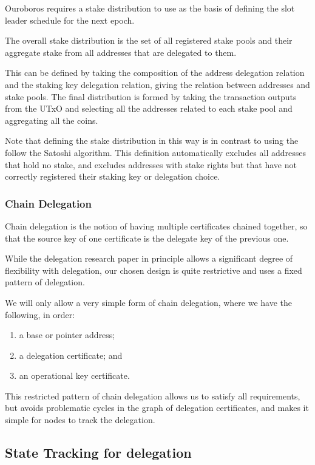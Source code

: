 \documentclass[11pt,a4paper,dvipsnames,twosided]{article}
\begin{document}
Ouroboros \citep{ouroboros_classic} requires a stake distribution to
use as the basis of defining the slot leader schedule for the next
epoch.

The overall stake distribution is the set of all registered stake pools
and their aggregate stake from all addresses that are delegated to them.

This can be defined by taking the composition of the address delegation
relation and the staking key delegation relation, giving the relation
between addresses and stake pools. The final distribution is formed by
taking the transaction outputs from the UTxO and selecting all the
addresses related to each stake pool and aggregating all the coins.

Note that defining the stake distribution in this way is in contrast to
using the follow the Satoshi algorithm. This definition automatically
excludes all addresses that hold no stake, and excludes addresses with
stake rights but that have not correctly registered their staking key or
delegation choice.

\subsubsection{Chain Delegation}
\label{chain-delegation}

Chain delegation is the notion of having multiple certificates chained
together, so that the source key of one certificate is the delegate key
of the previous one.

While the delegation research paper in principle allows a significant
degree of flexibility with delegation, our chosen design is quite
restrictive and uses a fixed pattern of delegation.

We will only allow a very simple form of chain delegation, where we have
the following, in order:

\begin{enumerate}
\item
  a base or pointer address;
\item
  a delegation certificate; and
\item
  an operational key certificate.
\end{enumerate}

This restricted pattern of chain delegation allows us to satisfy all
requirements, but avoids problematic cycles in the graph of delegation
certificates, and makes it simple for nodes to track the delegation.

\subsection{State Tracking for delegation}
\label{state-tracking-for-delegation}
\end{document}

